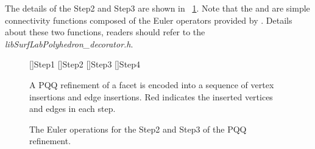 The details of the Step2 and Step3 are shown in 
\figurename\ \ref{fig:CCRefinementStep23}. Note that the
 and  are simple
connectivity functions composed of the Euler operators provided 
by \cgalpoly . Details about these two functions, readers should refer
to the \emph{lib\/SurfLab\/Polyhedron\_decorator.h}.
\\

\begin{figure}
  \centering 
  []{Step1}
  []{Step2}
  []{Step3}
  []{Step4}
  \caption{A PQQ refinement of a facet is encoded into a sequence of
  vertex insertions and edge insertions. Red indicates the inserted
  vertices and edges in each step.}
  \label{fig:CCRefinement}
  \vspace{0.6cm}
  \caption{The Euler operations for the Step2 and Step3 of 
  the PQQ refinement.}
  \label{fig:CCRefinementStep23}
\end{figure}

